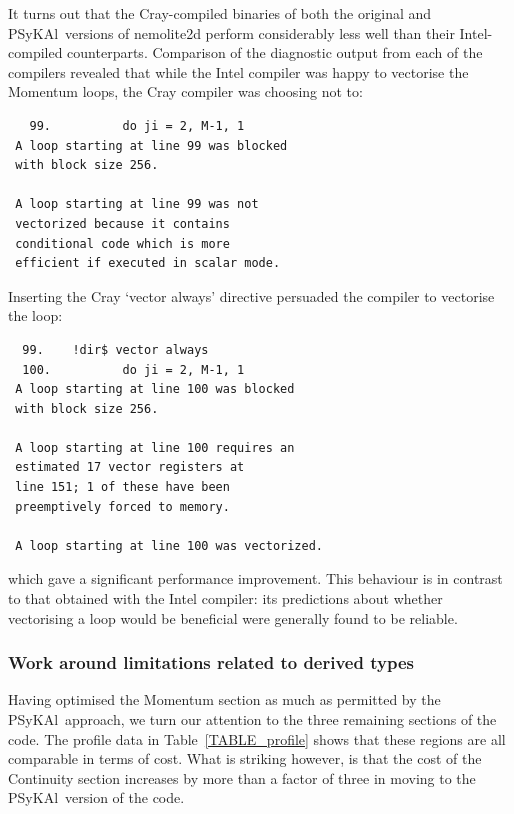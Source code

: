 \documentclass[journal]{IEEEtran}
\newcommand{\psykal}{{PS}y{KA}l\ }
\begin{document}
It turns out that the Cray-compiled binaries of both the original and
\psykal versions of nemolite2d perform considerably less well than
their Intel-compiled counterparts. Comparison of the diagnostic output
from each of the compilers revealed that while the Intel compiler was
happy to vectorise the Momentum loops, the Cray compiler was choosing
not to:
\begin{verbatim}
   99.          do ji = 2, M-1, 1
 A loop starting at line 99 was blocked 
 with block size 256.

 A loop starting at line 99 was not
 vectorized because it contains 
 conditional code which is more
 efficient if executed in scalar mode.
\end{verbatim}
Inserting the Cray `vector always' directive persuaded the compiler
to vectorise the loop:
\begin{verbatim}
  99.    !dir$ vector always
  100.          do ji = 2, M-1, 1
 A loop starting at line 100 was blocked
 with block size 256.

 A loop starting at line 100 requires an 
 estimated 17 vector registers at 
 line 151; 1 of these have been 
 preemptively forced to memory.

 A loop starting at line 100 was vectorized.
\end{verbatim}
which gave a significant performance improvement. This behaviour is in
contrast to that obtained with the Intel compiler: its predictions
about whether vectorising a loop would be beneficial were generally
found to be reliable.

\subsubsection{Work around limitations related to derived types}

Having optimised the Momentum section as much as permitted by the
\psykal approach, we turn our attention to the three remaining
sections of the code. The profile data in Table~\ref{TABLE_profile}
shows that these regions are all comparable in terms of cost. What is
striking however, is that the cost of the Continuity section increases
by more than a factor of three in moving to the \psykal version of the
code.
\end{document}
